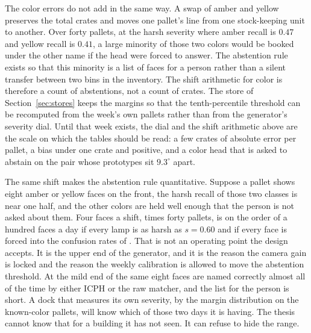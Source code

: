 The color errors do not add in the same way. A swap of amber and yellow preserves the total crates and moves one pallet's line from one stock-keeping unit to another. Over forty pallets, at the harsh severity where amber recall is $0.47$ and yellow recall is $0.41$, a large minority of those two colors would be booked under the other name if the head were forced to answer. The abstention rule exists so that this minority is a list of faces for a person rather than a silent transfer between two bins in the inventory. The shift arithmetic for color is therefore a count of abstentions, not a count of crates. The store of Section~\ref{sec:stores} keeps the margins so that the tenth-percentile threshold can be recomputed from the week's own pallets rather than from the generator's severity dial. Until that week exists, the dial and the shift arithmetic above are the scale on which the tables should be read: a few crates of absolute error per pallet, a bias under one crate and positive, and a color head that is asked to abstain on the pair whose prototypes sit $9.3^{\circ}$ apart.

The same shift makes the abstention rule quantitative. Suppose a pallet shows eight amber or yellow faces on the front, the harsh recall of those two classes is near one half, and the other colors are held well enough that the person is not asked about them. Four faces a shift, times forty pallets, is on the order of a hundred faces a day if every lamp is as harsh as $s=0.60$ and if every face is forced into the confusion rates of . That is not an operating point the design accepts. It is the upper end of the generator, and it is the reason the camera gain is locked and the reason the weekly calibration is allowed to move the abstention threshold. At the mild end of  the same eight faces are named correctly almost all of the time by either ICPH or the raw matcher, and the list for the person is short. A dock that measures its own severity, by the margin distribution on the known-color pallets, will know which of those two days it is having. The thesis cannot know that for a building it has not seen. It can refuse to hide the range.


